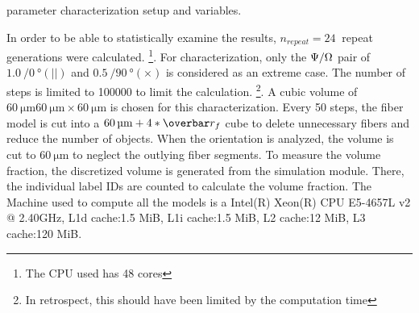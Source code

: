 \begin{table}[!b]
%
\centering
{}
\caption{parameter characterization setup and variables.}
\label{tab:cube2pop}
\end{table}
% 
In order to be able to statistically examine the results, $n_{\mathit{repeat}} = \SI{24}{}$ repeat generations were calculated. \footnote{The CPU used has 48 cores}.
For characterization, only the $\textnormal{$\Psi$}/\textnormal{$\Omega$}$ pair of $\SI{1.0}{}/\SI{0}{\degree}(||)$ and $\SI{0.5}{}/\SI{90}{\degree}(\times)$ is considered as an extreme case.
The number of steps is limited to \SI{100000}{} to limit the calculation. \footnote{In retrospect, this should have been limited by the computation time}.
A cubic volume of $\SI{60}{\micro\meter} \SI{60}{\micro\meter} \times \SI{60}{\micro\meter}$ is chosen for this characterization.
Every 50 steps, the fiber model is cut into a $\SI{60}{\micro\meter}+4*\fiberRadiusMean$ cube to delete unnecessary fibers and reduce the number of objects.
When the orientation is analyzed, the volume is cut to $\SI{60}{\micro\meter}$ to neglect the outlying fiber segments.
To measure the volume fraction, the discretized volume is generated from the simulation module.
There, the individual label IDs are counted to calculate the volume fraction.
% 
The Machine used to compute all the models is a 
Intel(R) Xeon(R) CPU E5-4657L v2 @ 2.40GHz, L1d cache:1.5 MiB, L1i cache:1.5 MiB, L2 cache:12 MiB, L3 cache:120 MiB.
% 
% 
% 
